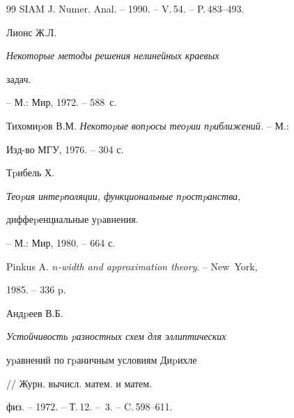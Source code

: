 \begin{thebibliography}{99}
SIAM J. Numer. Anal. -- 1990. -- V.\,54. -- P.\,483--493.







Лионс Ж.Л. {\em Некоторые методы решения нелинейных краевых


задач.} -- М.: Мир, 1972. -- 588~с.







Тихомиpов В.М. {\em Некотоpые вопpосы теоpии пpиближений.} -- М.:


Изд-во МГУ, 1976. -- 304 с.







Тpибель Х. {\em Теоpия интеpполяции, функциональные пpостpанства,


диффеpенциальные уpавнения.} -- М.: Мир, 1980. -- 664 с.







Pinkus A. {\em $n$-width and approximation theory}. -- New~York,


1985. -- 336 p.







Андpеев В.Б. {\em Устойчивость pазностных схем для эллипти\-ческих


уpавнений по гpаничным условиям Диpихле} // Журн. вычисл. матем. и матем.


физ. -- 1972. -- Т.\,12. -- \No\,3. -- C.\,598--611.





\end{thebibliography}





\vskip 2cm


















